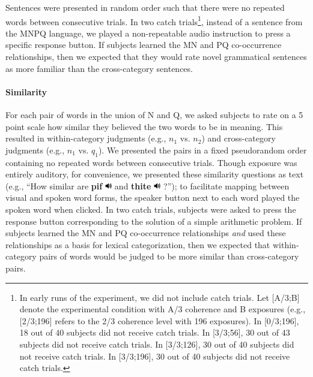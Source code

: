 \documentclass[man,floatsintext]{apa6}
\begin{document}
Sentences were presented in random order such that there were no
repeated words between consecutive trials. In two catch
trials\footnote{In early runs of the experiment, we did not include
catch trials.  Let [A/3;B] denote the experimental condition with A/3
coherence and B exposures (e.g., [2/3;196] refers to the 2/3 coherence
level with 196 exposures). In [0/3;196], 18 out of 40 subjects did not
receive catch trials. In [3/3;56], 30 out of 43 subjects did not
receive catch trials. In [3/3;126], 30 out of 40 subjects did not
receive catch trials. In [3/3;196], 30 out of 40 subjects did not
receive catch trials.}, instead of a sentence from the MNPQ language,
we played a non-repeatable audio instruction to press a specific
response button.  If subjects learned the MN and PQ co-occurrence
relationships, then we expected that they would rate novel grammatical
sentences as more familiar than the cross-category sentences.

\paragraph{Similarity} For each pair of words in the union of N and Q,
we asked subjects to rate on a 5 point scale how similar they believed
the two words to be in meaning. This resulted in within-category
judgments (e.g., $n_1$ vs. $n_2$) and cross-category judgments (e.g.,
$n_1$ vs. $q_1$). We presented the pairs in a fixed pseudorandom order
containing no repeated words between consecutive trials. Though
exposure was entirely auditory, for convenience, we presented these
similarity questions as text (e.g., ``How similar are
\textbf{pif} \includegraphics[width=0.3cm]{play.png} and
\textbf{thite} \includegraphics[width=0.3cm]{play.png} ?''); to
facilitate mapping between visual and spoken word forms, the speaker
button next to each word played the spoken word when clicked. In two
catch trials, subjects were asked to press the response button
corresponding to the solution of a simple arithmetic problem. If
subjects learned the MN and PQ co-occurrence relationships \emph{and}
used these relationships as a basis for lexical categorization, then
we expected that within-category pairs of words would be judged to be
more similar than cross-category pairs.
\end{document}
